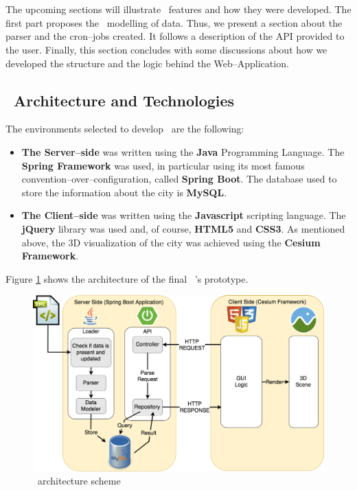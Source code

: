 \section{\applicationName} \label{projectDesign}
The upcoming sections will illustrate \applicationName\ features and how they were developed. The first part proposes the \applicationName\ modelling of data. Thus, we present a section about the parser and the cron--jobs created. It follows a description of the API provided to the user. Finally, this section concludes with some discussions about how we developed the structure and the logic behind the Web--Application.

\subsection{\applicationName\ Architecture and Technologies}
The environments selected to develop \applicationName\ are the following:
\begin{itemize}
	\item {\bf The Server--side} was written using the {\bf Java} Programming Language. The {\bf Spring Framework} was used, in particular using its most famous convention--over--configuration, called {\bf Spring Boot}. The database used to store the information about the city is {\bf MySQL}.
	\item {\bf The Client--side} was written using the {\bf Javascript} scripting language. The {\bf jQuery} library was used and, of course, {\bf HTML5} and {\bf CSS3}. As mentioned above, the 3D visualization of the city was achieved using the {\bf Cesium Framework}.
\end{itemize}
Figure \ref{fig:project_structure} shows the architecture of the final \applicationName\ 's prototype.
\begin{figure}[H]
\centering
\includegraphics[width=1.0\textwidth]{chapter3/images/project_structure}
\caption{\applicationName\ architecture scheme}
\label{fig:project_structure}
\end{figure}

